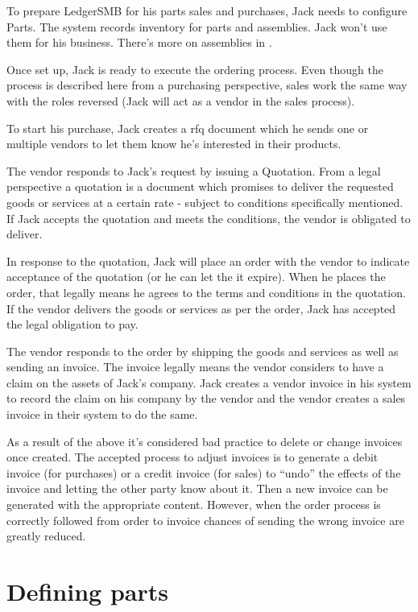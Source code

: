To prepare LedgerSMB for his parts sales and purchases, Jack needs to configure Parts.
The system records inventory for parts and assemblies. Jack won't use them for his
business. There's more on assemblies in .

Once set up, Jack is ready to execute the ordering process. Even though the process
is described here from a purchasing perspective, sales work the same way with the roles
reversed (Jack will act as a vendor in the sales process).

To start his purchase, Jack creates a \gls{rfq} document which
he sends one or multiple vendors to let them know he's interested in their products.

The vendor responds to Jack's request by issuing a Quotation. From a legal perspective
a quotation is a document which promises to deliver the requested goods or services at a
certain rate - subject to conditions specifically mentioned. If Jack accepts the quotation
and meets the conditions, the vendor is obligated to deliver.

In response to the quotation, Jack will place an order with the vendor to indicate
acceptance of the quotation (or he can let the
it expire). When he places the order, that legally means he agrees to the terms
and conditions in the quotation. If the vendor delivers the goods or services as per the
order, Jack has accepted the legal obligation to pay.

The vendor responds to the order by shipping the goods and services as well
as sending an invoice. The invoice legally means the vendor considers to have a claim on the assets
of Jack's company. Jack creates a vendor invoice in his system to record the claim on his
company by the vendor and the vendor creates a sales invoice in their system to do the same.

As a result of the above it's considered bad practice to delete or change invoices once
created. The accepted process to adjust invoices is to generate a debit invoice (for purchases)
or a credit invoice (for sales) to ``undo'' the effects of the invoice and letting the other party
know about it. Then a new invoice can be generated with the appropriate content. However,
when the order process is correctly followed from order to invoice chances of sending the wrong
invoice are greatly reduced.

\section{Defining parts}
\label{sec-stock-parts}


